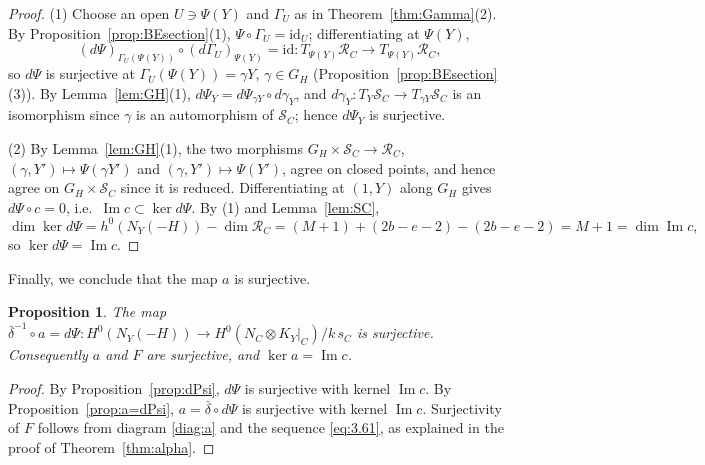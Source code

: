 \documentclass[11pt,twoside]{amsart}
\theoremstyle{plain}
\newtheorem{proposition}[theorem]{Proposition}
\theoremstyle{definition}
\newcommand{\PP}{\mathbb{P}}
\newcommand{\OO}{\mathcal{O}}
\newcommand{\coker}{\operatorname{coker}}
\renewcommand{\Im}{\operatorname{Im}}
\newcommand{\id}{\mathrm{id}}
\newcommand{\Yt}{\widetilde{Y}}
\newcommand{\NY}{N_{Y}}
\newcommand{\SC}{\mathcal{S}_C}
\newcommand{\RC}{\mathcal{R}_C}
\newcommand{\GH}{G_H}
\begin{document}
\begin{proof}
(1) Choose an open $U\ni\Psi(Y)$ and $\Gamma_U$ as in Theorem~\ref{thm:Gamma}(2). By Proposition~\ref{prop:BEsection}(1), $\Psi\circ\Gamma_U=\id_U$; differentiating at $\Psi(Y)$,
\[
(d\Psi)_{\Gamma_U(\Psi(Y))}\circ {(d\Gamma_U)}_{\Psi(Y)}=\id\colon T_{\Psi(Y)}\RC\to T_{\Psi(Y)}\RC,
\]
so $d\Psi$ is surjective at $\Gamma_U(\Psi(Y))=\gamma Y$, $\gamma\in\GH$ (Proposition~\ref{prop:BEsection}(3)). By Lemma~\ref{lem:GH}(1), $d\Psi_Y=d\Psi_{\gamma Y}\circ d\gamma_Y$, and $d\gamma_Y\colon T_Y\SC\to T_{\gamma Y}\SC$ is an isomorphism since $\gamma$ is an automorphism of $\SC$; hence $d\Psi_Y$ is surjective.

(2) By Lemma~\ref{lem:GH}(1), the two morphisms $\GH\times\SC\to\RC$, $(\gamma,Y')\mapsto\Psi(\gamma Y')$ and $(\gamma,Y')\mapsto\Psi(Y')$, agree on closed points, and hence agree on $\GH\times\SC$ since it is reduced. Differentiating at $(1,Y)$ along $\GH$ gives $d\Psi\circ c=0$, i.e.\ $\Im c\subset\ker d\Psi$. By (1) and Lemma~\ref{lem:SC},
\[
\dim\ker d\Psi=h^0(\NY(-H))-\dim\RC=(M+1)+(2b-e-2)-(2b-e-2)=M+1=\dim\Im c ,
\]
so $\ker d\Psi=\Im c$.
\end{proof}

Finally, we conclude that the map $a$ is surjective.

\begin{proposition}\label{prop:a-surj}
The map $\bar\delta^{-1}\circ a=d\Psi\colon H^0(\NY(-H))\to H^0(N_C\otimes K_Y|_C)/k\,s_C$ is surjective. Consequently $a$ and $F$ are surjective, and $\ker a=\Im c$.
\end{proposition}

\begin{proof}
By Proposition~\ref{prop:dPsi}, $d\Psi$ is surjective with kernel $\Im c$. By Proposition~\ref{prop:a=dPsi}, $a=\bar\delta\circ d\Psi$ is surjective with kernel $\Im c$. Surjectivity of $F$ follows from diagram \eqref{diag:a} and the sequence \eqref{eq:3.61}, as explained in the proof of Theorem~\ref{thm:alpha}.
\end{proof}

\end{document}
